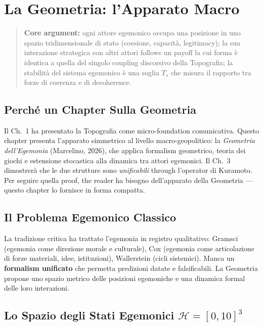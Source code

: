\chapter{La Geometria: l'Apparato
Macro}\label{la-geometria-lapparato-macro}

\begin{quote}
\textbf{Core argument:} ogni attore egemonico occupa una posizione
in uno spazio tridimensionale di stato (coesione, capacità,
legitimacy); la sua interazione strategica con altri attori follows un
payoff la cui forma è identica a quella del singolo coupling
discorsivo della Topografia; la stabilità del sistema egemonico è una
soglia \(T_s\) che misura il rapporto tra forze di coerenza e di
decoherence.
\end{quote}



\section{Perché un Chapter Sulla
Geometria}\label{perchuxe9-un-chapter-sulla-geometria}

Il Ch.~1 ha presentato la Topografia come micro-foundation comunicativa.
Questo chapter presenta l'apparato simmetrico al livello
macro-geopolitico: la \emph{Geometria dell'Egemonia} (Marcelino, 2026),
che applica formalism geometrico, teoria dei giochi e estensione
stocastica alla dinamica tra attori egemonici. Il Ch.~3 dimostrerà che
le due strutture sono \emph{unificabili} through l'operator di
Kuramoto. Per seguire quella proof, the reader ha bisogno
dell'apparato della Geometria --- questo chapter lo fornisce in forma
compatta.



\section{Il Problema Egemonico
Classico}\label{il-problema-egemonico-classico}

La tradizione critica ha trattato l'egemonia in registro qualitativo:
Gramsci (egemonia come direzione morale e culturale), Cox (egemonia come
articolazione di forze materiali, idee, istituzioni), Wallerstein (cicli
sistemici). Manca un \textbf{formalism unificato} che permetta
predizioni datate e falsificabili. La Geometria propone uno spazio
metrico delle posizioni egemoniche e una dinamica formal delle loro
interazioni.



\section{\texorpdfstring{Lo Spazio degli Stati Egemonici
\(\mathcal{H} = [0, 10]^3\)}{Lo Spazio degli Stati Egemonici \textbackslash mathcal\{H\} = {[}0, 10{]}\^{}3}}\label{lo-spazio-degli-stati-egemonici-mathcalh-0-103}

